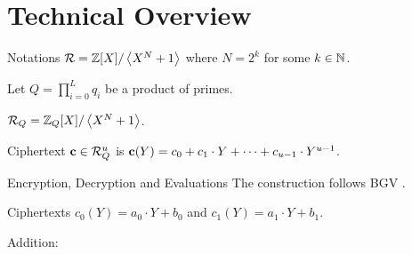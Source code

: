 \section{Technical Overview}
\begin{frame}{Notations}
	$\mathcal{R} = \mathbb{Z}[X] / \left\langle X^N + 1\right\rangle$ where $N = 2^k$ for some $k \in \mathbb{N}$.
	
	Let $Q = \prod_{i = 0}^L q_i$ be a product of primes.
	
	$\mathcal{R}_Q = \mathbb{Z}_Q[X]/ \left\langle X^N + 1\right\rangle$.
	
	Ciphertext $\mathbf{c} \in \mathcal{R}_Q^u$ is $\mathbf{c}(Y) = c_0 + c_1 \cdot Y + \dots + c_{u - 1} \cdot Y^{u-1}$.
\end{frame}

\begin{frame}{Encryption, Decryption and Evaluations}
	The construction follows BGV \cite{ITCS:BraGenVai12}.
	
	Ciphertexts $c_0(Y) = a_0\cdot Y + b_0$ and $c_1(Y) = a_1 \cdot Y + b_1$.
	
	Addition: 
\end{frame}